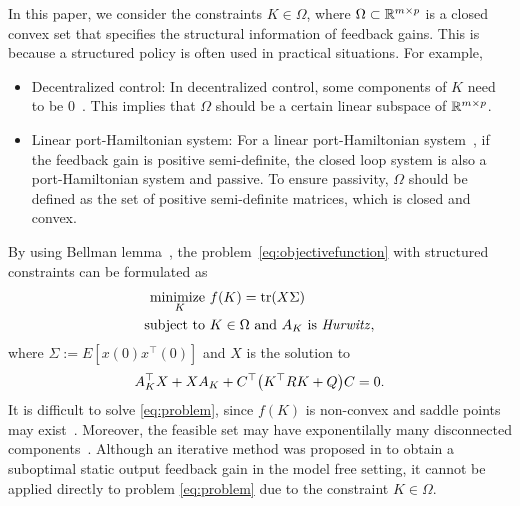 In this paper, we consider the constraints $K\in \Omega$,
where $\Omega \subset \mathbb{R}^{m\times p}$ is a closed convex set
that specifies the structural information of feedback gains.
This is because a structured policy is often used in practical situations.
For example,
\begin{itemize}
    \item Decentralized control: In decentralized control, some components of $K$ need to be $0$~\cite{jovanovic2016controller}.
This implies that $\Omega$ should be a certain linear subspace of $\mathbb{R}^{m\times p}$.

\item Linear port-Hamiltonian system: For a linear port-Hamiltonian system~\cite{Jacob2012linear}, 
if the feedback gain is positive semi-definite, the closed loop system is also a port-Hamiltonian system and passive. To ensure passivity, $\Omega$ should be defined as the set of positive semi-definite matrices, which is closed and convex.

\end{itemize}





By using Bellman lemma~\cite{bellman1957notes}, the problem~\eqref{eq:objectivefunction} with structured constraints can be formulated as
\begin{align}
  \begin{aligned}
    \mathop{\text{minimize }}\limits_K & f(K) = \tr(X\Sigma) \\
    \mathop{\text{subject to }}  & K \in \Omega\,\, \text{and}\,\, A_K\text{ is \textit{Hurwitz}},
  \end{aligned}\label{eq:problem}
\end{align}
where
$
  \Sigma  := E[x(0)x^\top(0)]
$
and $X$ is the solution to
\begin{align}
  A_K^\top X + XA_K + C^\top \qty(K^\top RK + Q)C = 0.
\end{align}
It is difficult to solve \eqref{eq:problem}, since  $f(K)$ is non-convex and saddle points may exist~\cite{fatkhullin2021optimizing}.
Moreover,
 the feasible set may have exponentilally many disconnected components~\cite{feng2019exponential}. 
Although an iterative method was proposed in \cite{zhu2015adaptive} to obtain a suboptimal static output feedback gain in the model free setting,
it cannot be applied directly to problem \eqref{eq:problem} due to the constraint $K\in \Omega$.

